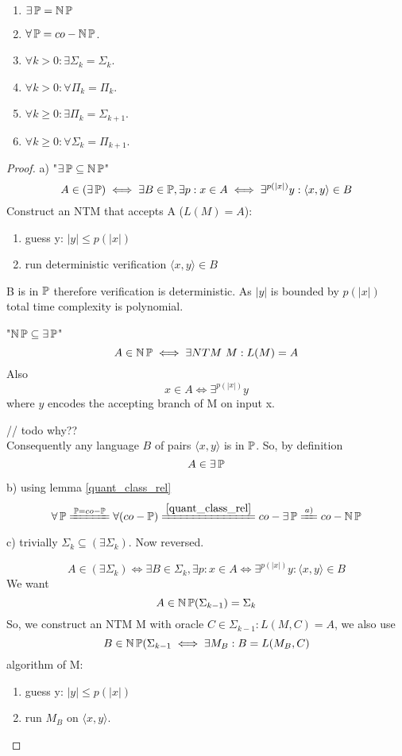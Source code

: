 \begin{properties}\label{polyn_q}
	\begin{enumerate}[label=\alph*)]
		\item $\exists \operatorname{\mathbb{P}} = \operatorname{\operatorname{\mathbb{N}}\mathbb{P}}$
		\item $\forall \operatorname{\mathbb{P}} = co-\operatorname{\operatorname{\mathbb{N}}\mathbb{P}} $.
		\item $\forall k > 0: \exists \Sigma_k = \Sigma_k$.
		\item $\forall k > 0: \forall \Pi_k= \Pi_k$.
		\item $\forall k \geq 0: \exists \Pi_k = \Sigma_{k + 1}$.
		\item $\forall k \geq 0: \forall \Sigma_k = \Pi_{k + 1}$.
	\end{enumerate}
\end{properties}
\begin{proof}
	a) "$\exists \operatorname{\mathbb{P}} \subseteq \operatorname{\operatorname{\mathbb{N}}\mathbb{P}}$"
	\[ A \in (\exists \operatorname{\mathbb{P}}) \iff \exists B \in \operatorname{\mathbb{P}}, \exists p: x \in A \iff \exists^{p(|x|)} y: \langle x, y \rangle \in B \]
	Construct an NTM that accepts A ($L(M) = A$):

	\begin{enumerate}
		\item guess y: $|y| \leq p(|x|)$
		\item run deterministic verification $\langle x, y \rangle \in B$
	\end{enumerate}
	B is in $\operatorname{\mathbb{P}}$ therefore verification is deterministic.
	As $|y|$ is bounded by $p(|x|)$ total time complexity is polynomial.

	"$\operatorname{\operatorname{\mathbb{N}}\mathbb{P}} \subseteq \exists \operatorname{\mathbb{P}}$"
	\[ A \in \operatorname{\operatorname{\mathbb{N}}\mathbb{P}} \iff \exists NTM\ M: L(M) = A \]
	Also
	\[ x \in A \iff \exists^{p(|x|)} y \]
	where $y$ encodes the accepting branch of M on input x.

	// todo why??\\
	Consequently any language $B$ of pairs $\langle x, y \rangle$ is in $\operatorname{\mathbb{P}}$.
	So, by definition
	\[ A \in \exists \operatorname{\mathbb{P}} \]

	b) using lemma \cref{quant_class_rel}
	\[ \forall \TP \xlongequal{\TP = co-\TP} \forall(co-\TP) \xlongequal{\cref{quant_class_rel}} co-\exists \TP \xlongequal{a)} co-\TNP \]

	c) trivially $\Sigma_k \subseteq (\exists \Sigma_k)$. Now reversed.

	\[ A \in (\exists \Sigma_k) \iff \exists B \in \Sigma_k, \exists p: x \in A \iff \exists^{p(|x|)} y: \langle x, y \rangle \in B \]
	We want
	\[ A \in \operatorname{\operatorname{\mathbb{N}}\mathbb{P}}(\Sigma_{k - 1}) = \Sigma_k \]
	So, we construct an NTM M with oracle $C \in \Sigma_{k - 1}: L(M, C) = A$, we also use
	\[ B \in \operatorname{\operatorname{\mathbb{N}}\mathbb{P}}(\Sigma_{k - 1} \iff \exists M_B: B = L(M_B, C) \]
	algorithm of M:
	\begin{enumerate}
		\item guess y: $|y| \leq p(|x|)$
		\item run $M_B$ on $\langle x, y \rangle$.
	\end{enumerate}


\end{proof}
